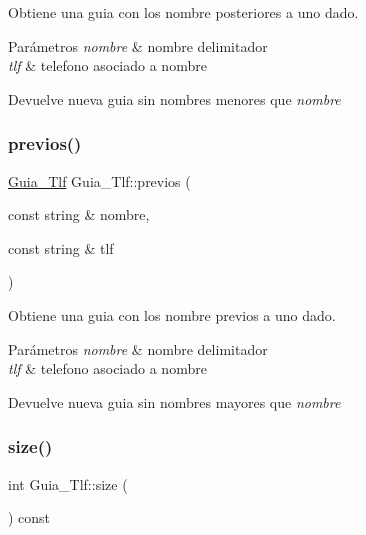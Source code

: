 Obtiene una guia con los nombre posteriores a uno dado. 


\begin{DoxyParams}{Parámetros}
{\em nombre} & nombre delimitador \\
\hline
{\em tlf} & telefono asociado a nombre \\
\hline
\end{DoxyParams}
\begin{DoxyReturn}{Devuelve}
nueva guia sin nombres menores que {\itshape nombre} 
\end{DoxyReturn}
\mbox{\label{classGuia__Tlf_a0a8ed6b386e90a6799a8693653b3e187}} 
\subsubsection{\texorpdfstring{previos()}{previos()}}
{\footnotesize\ttfamily \hyperlink{classGuia__Tlf}{Guia\+\_\+\+Tlf} Guia\+\_\+\+Tlf\+::previos (\begin{DoxyParamCaption}\item[{const string \&}]{nombre,  }\item[{const string \&}]{tlf }\end{DoxyParamCaption})}



Obtiene una guia con los nombre previos a uno dado. 


\begin{DoxyParams}{Parámetros}
{\em nombre} & nombre delimitador \\
\hline
{\em tlf} & telefono asociado a nombre \\
\hline
\end{DoxyParams}
\begin{DoxyReturn}{Devuelve}
nueva guia sin nombres mayores que {\itshape nombre} 
\end{DoxyReturn}
\mbox{\label{classGuia__Tlf_a727ab46d490b4196a71f623644906a81}} 
\subsubsection{\texorpdfstring{size()}{size()}}
{\footnotesize\ttfamily int Guia\+\_\+\+Tlf\+::size (\begin{DoxyParamCaption}{ }\end{DoxyParamCaption}) const}



